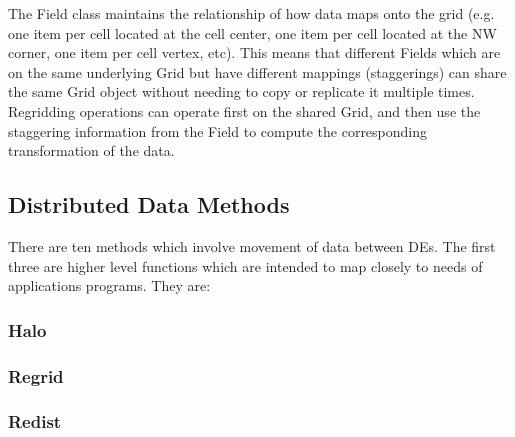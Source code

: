 

The Field class maintains the relationship of
how data maps onto the grid (e.g. one item per cell located at
the cell center, one item per cell located at the NW corner, 
one item per cell vertex, etc).  This means that different Fields
which are on the same underlying Grid but have different
mappings (staggerings) can share the same Grid object without
needing to copy or replicate it multiple times.  Regridding
operations can operate first on the shared Grid, and then
use the staggering information from the Field to compute the
corresponding transformation of the data.




\subsection{Distributed Data Methods}

There are ten methods which involve movement of data between DEs.
The first three are higher level functions which are intended to
map closely to needs of applications programs.  They are:

\subsubsection{Halo}


\subsubsection{Regrid}


\subsubsection{Redist}


